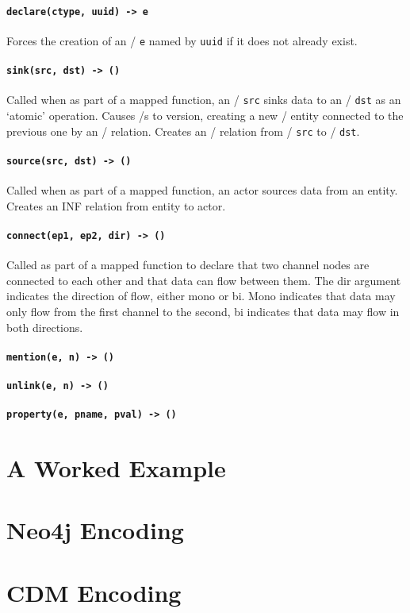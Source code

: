 \documentclass[12pt,twoside,a4paper]{article}
\newcommand{\field}[1]{\texttt{#1}}
\newcommand{\para}[1]{\paragraph{#1\\}}
\begin{document}
\para{\texttt{declare(ctype, uuid) -> e}}
\label{sec:map:verbs:declare}
Forces the creation of an \Entity/ \field{e} named by \field{uuid} if it does not already exist.

\para{\texttt{sink(src, dst) -> ()}}
\label{sec:map:verbs:sink}
Called when as part of a mapped function, an \Actor/ \field{src} sinks data to an \Entity/ \field{dst} as an ‘atomic’ operation.
Causes \Store/s to version, creating a new \Store/ entity connected to the previous one by an \INF/ relation.
Creates an \INF/ relation from \Actor/ \field{src} to \Entity/ \field{dst}. 

\para{\texttt{source(src, dst) -> ()}}
\label{sec:map:verbs:source}
Called when as part of a mapped function, an actor sources data from an entity.
Creates an INF relation from entity to actor.

\para{\texttt{connect(ep1, ep2, dir) -> ()}}
\label{sec:map:verbs:connect}
Called as part of a mapped function to declare that two channel nodes are connected to each other and that data can flow between them. The dir argument indicates the direction of flow, either mono or bi. Mono indicates that data may only flow from the first channel to the second, bi indicates that data may flow in both directions. 

\para{\texttt{mention(e, n) -> ()}}
\label{sec:map:verbs:mention}

\para{\texttt{unlink(e, n) -> ()}}
\label{sec:map:verbs:unlink}

\para{\texttt{property(e, pname, pval) -> ()}}
\label{sec:map:verbs:property}

\appendix

\section{A Worked Example}
\label{app:example}

\section{Neo4j Encoding}
\label{app:enc:neo4j}

\section{CDM Encoding}
\label{app:enc:cdm}
\end{document}
